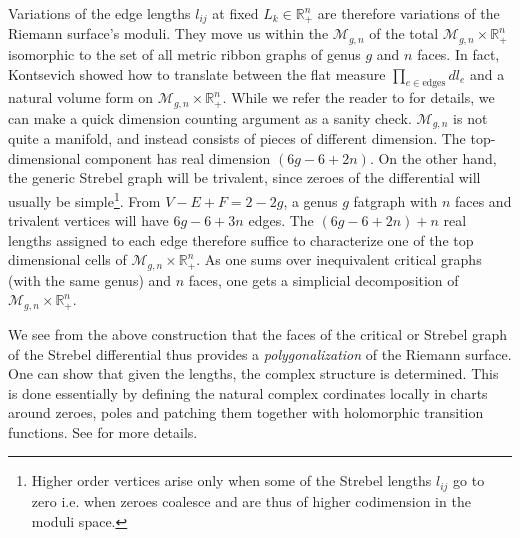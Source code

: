 \documentclass[english]{article}
\let\mc=\mathcal
\let\mb=\mathbb
\begin{document}
Variations of the edge lengths $l_{ij}$ at fixed $L_k \in \mb{R}_{+}^{n}$ are therefore variations of the Riemann surface's moduli. They move us within the $\mc{M}_{g,n}$ of the total $\mc{M}_{g,n} \times \mb{R}_{+}^{n}$ isomorphic to the set of all metric ribbon graphs of genus $g$ and $n$ faces. In fact, Kontsevich showed how to translate between the flat measure $\prod_{e \in \text{edges}} dl_{e}$ and a natural volume form on $\mc{M}_{g,n} \times \mb{R}_{+}^{n}$. While we refer the reader to  \cite{KontsevichAiry} for details, we can make a quick dimension counting argument as a sanity check. $\mc{M}_{g,n}$ is not quite a manifold, and instead consists of pieces of different dimension. The top-dimensional component has real dimension $(6g-6+2n)$. On the other hand, the generic Strebel graph will be trivalent, since zeroes of the differential will usually be simple\footnote{Higher order vertices arise only when some of the Strebel lengths $l_{ij}$ go to zero i.e. when zeroes coalesce and are thus of higher codimension in the moduli space.}. From $V-E+F = 2-2g$, a genus $g$ fatgraph with $n$ faces and trivalent vertices will have $6g-6+3n$ edges. The $(6g-6+2n) + n$ real lengths assigned to each edge therefore suffice to characterize one of the top dimensional cells of $\mc{M}_{g,n} \times \mb{R}_{+}^{n}$. As one sums over inequivalent critical graphs (with the same genus) and $n$ faces, one gets a simplicial decomposition of $\mc{M}_{g,n} \times \mb{R}_{+}^{n}$.

We see from the above construction that the faces of the critical or Strebel graph of the Strebel differential thus provides a \textit{polygonalization} of the Riemann surface. One can show that given the lengths, the complex structure is determined. This is done essentially by defining the natural complex cordinates locally in charts around zeroes, poles and patching them together with holomorphic transition functions. See \cite{mulaseStrebel} for more details. 
\end{document}
